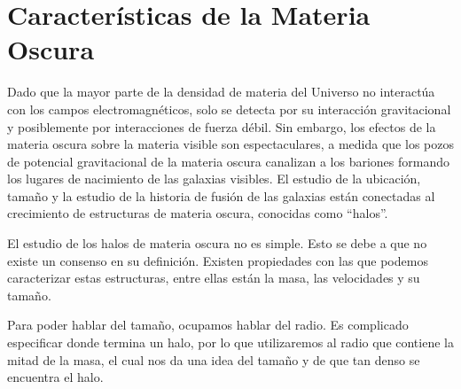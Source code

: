 \newpage
\section{Características de la Materia Oscura}

Dado que la mayor parte de la densidad de materia del Universo no interactúa con los campos electromagnéticos, solo se detecta por su interacción gravitacional y posiblemente por interacciones de fuerza débil. Sin embargo, los efectos de la materia oscura sobre la materia visible son espectaculares, a medida que los pozos de potencial gravitacional de la materia oscura canalizan a los bariones formando los lugares de nacimiento de las galaxias visibles. El estudio de la ubicación, tamaño y la estudio de la historia de fusión  de las galaxias están conectadas al crecimiento de estructuras de materia oscura, conocidas como ``halos''.

El estudio de los halos de materia oscura no es simple. Esto se debe a que no existe un consenso en su definición. Existen propiedades con las que podemos caracterizar estas estructuras, entre ellas están la masa, las velocidades y su tamaño.

Para poder hablar del tamaño, ocupamos hablar del radio. Es complicado especificar donde termina un halo, por lo que utilizaremos al radio que contiene la mitad de la masa, el cual nos da una idea del tamaño y de que tan denso se encuentra el halo.

